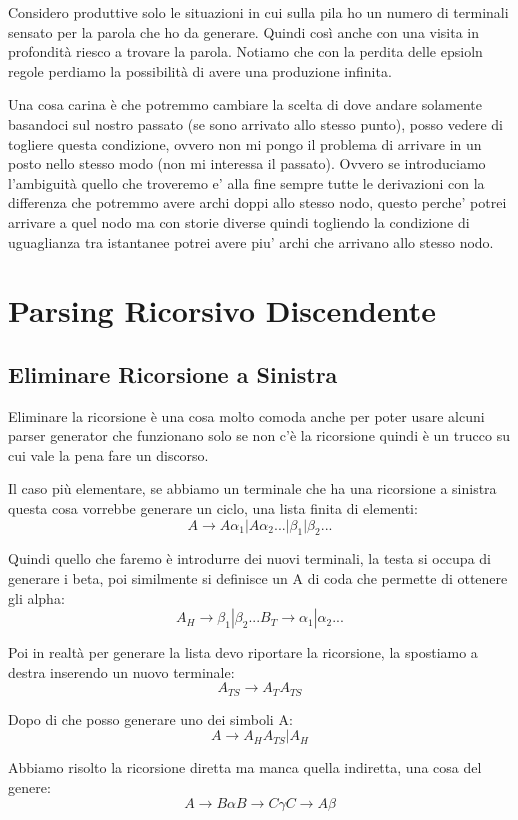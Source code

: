Considero produttive solo le situazioni in cui sulla pila ho un numero di terminali sensato per la parola che ho da generare. Quindi così anche con una visita in profondità riesco a trovare la parola. Notiamo che con la perdita delle epsioln regole perdiamo la possibilità di avere una produzione infinita.

Una cosa carina è che potremmo cambiare la scelta di dove andare solamente basandoci sul nostro passato (se sono arrivato allo stesso punto), posso vedere di togliere questa condizione, ovvero non mi pongo il problema di arrivare in un posto nello stesso modo (non mi interessa il passato). Ovvero se introduciamo l'ambiguità quello che troveremo e' alla fine sempre tutte le derivazioni con la differenza che potremmo avere archi doppi allo stesso nodo, questo perche' potrei arrivare a quel nodo ma con storie diverse quindi togliendo la condizione di uguaglianza tra istantanee potrei avere piu' archi che arrivano allo stesso nodo.

\section{Parsing Ricorsivo Discendente}

\subsection{Eliminare Ricorsione a Sinistra}
Eliminare la ricorsione è una cosa molto comoda anche per poter usare alcuni parser generator che funzionano solo se non c'è la ricorsione quindi è un trucco su cui vale la pena fare un discorso.

Il caso più elementare, se abbiamo un terminale che ha una ricorsione a sinistra questa cosa vorrebbe generare un ciclo, una lista finita di elementi:
\[
A \rightarrow A \alpha_1 | A\alpha_2 ... | \beta_1 | \beta_2 ...
\]

Quindi quello che faremo è introdurre dei nuovi terminali, la testa si occupa di generare i beta, poi similmente si definisce un A di coda che permette di ottenere gli alpha:
\[
A_H \rightarrow \beta_1 | \beta_2 ...
B_T \rightarrow \alpha_1 | \alpha_2 ...
\]

Poi in realtà per generare la lista devo riportare la ricorsione, la spostiamo a destra inserendo un nuovo terminale:
\[
A_{TS} \rightarrow A_T A_{TS}
\]

Dopo di che posso generare uno dei simboli A:
\[
A \rightarrow A_H A_{TS} | A_H
\]

Abbiamo risolto la ricorsione diretta ma manca quella indiretta, una cosa del genere:
\[
A \rightarrow B \alpha
B \rightarrow C \gamma
C \rightarrow A \beta
\]

